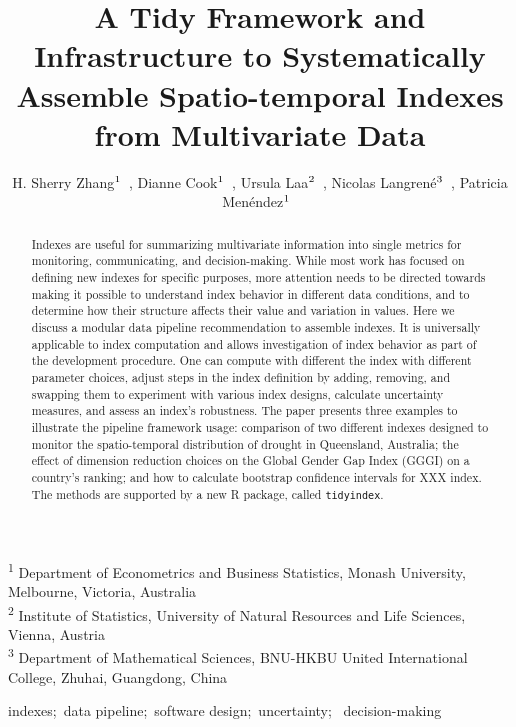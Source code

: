 \documentclass[
]{interact}
\title{A Tidy Framework and Infrastructure to Systematically Assemble
Spatio-temporal Indexes from Multivariate Data}
\author{H. Sherry
Zhang$\textsuperscript{1}$~\orcidlink{0000-0002-7122-1463}, Dianne
Cook$\textsuperscript{1}$~\orcidlink{0000-0002-3813-7155}, Ursula
Laa$\textsuperscript{2}$~\orcidlink{0000-0002-0249-6439}, Nicolas
Langrené$\textsuperscript{3}$~\orcidlink{0000-0001-7601-4618}, Patricia
Menéndez$\textsuperscript{1}$~\orcidlink{0000-0003-0701-6315}}
\begin{document}
\captionsetup{labelsep=space}
\maketitle
\textsuperscript{1} Department of Econometrics and Business
Statistics, Monash University, Melbourne,
Victoria, Australia\\ \textsuperscript{2} Institute of
Statistics, University of Natural Resources and Life
Sciences, Vienna, Austria\\ \textsuperscript{3} Department of
Mathematical Sciences, BNU-HKBU United International College, Zhuhai,
Guangdong, China
\begin{abstract}
Indexes are useful for summarizing multivariate information into single
metrics for monitoring, communicating, and decision-making. While most
work has focused on defining new indexes for specific purposes, more
attention needs to be directed towards making it possible to understand
index behavior in different data conditions, and to determine how their
structure affects their value and variation in values. Here we discuss a
modular data pipeline recommendation to assemble indexes. It is
universally applicable to index computation and allows investigation of
index behavior as part of the development procedure. One can compute
with different the index with different parameter choices, adjust steps
in the index definition by adding, removing, and swapping them to
experiment with various index designs, calculate uncertainty measures,
and assess an index's robustness. The paper presents three examples to
illustrate the pipeline framework usage: comparison of two different
indexes designed to monitor the spatio-temporal distribution of drought
in Queensland, Australia; the effect of dimension reduction choices on
the Global Gender Gap Index (GGGI) on a country's ranking; and how to
calculate bootstrap confidence intervals for XXX index. The methods are
supported by a new R package, called \texttt{tidyindex}.
\end{abstract}
\begin{keywords}
\def\sep{;\ }
indexes\sep data pipeline\sep software design\sep uncertainty\sep 
decision-making
\end{keywords}
\ifdefined\Shaded\renewenvironment{Shaded}{\begin{tcolorbox}[frame hidden, boxrule=0pt, interior hidden, borderline west={3pt}{0pt}{shadecolor}, sharp corners, enhanced, breakable]}{\end{tcolorbox}}\fi
\end{document}

